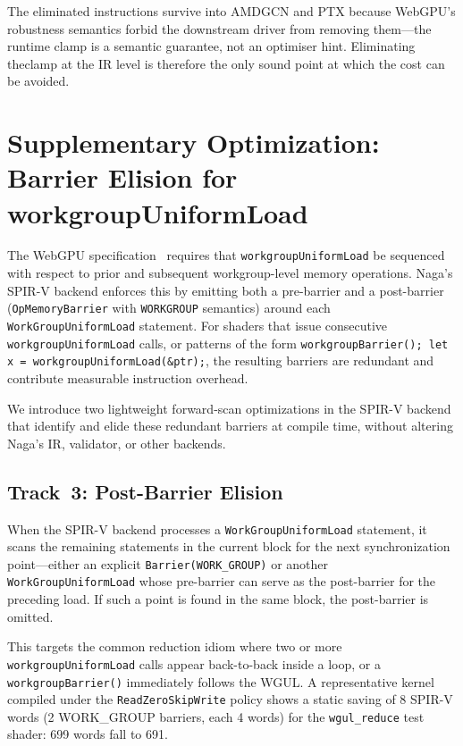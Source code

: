 \documentclass[10pt,a4paper,twocolumn]{article}
\begin{document}
The eliminated instructions survive into AMDGCN and PTX because WebGPU's
robustness semantics forbid the downstream driver from removing them---the
runtime clamp is a semantic guarantee, not an optimiser hint. Eliminating theclamp at the IR level is therefore the only sound point at which the cost can be avoided.

\section{Supplementary Optimization: Barrier Elision for workgroupUniformLoad}
\label{sec:barrier-elision}

The WebGPU specification~\cite{webgpu} requires that
\texttt{workgroupUniformLoad} be sequenced with respect to prior and
subsequent workgroup-level memory operations.  Naga's SPIR-V backend enforces
this by emitting both a pre-barrier and a post-barrier
(\texttt{OpMemoryBarrier} with \texttt{WORKGROUP} semantics) around each
\texttt{WorkGroupUniformLoad} statement.  For shaders that issue consecutive
\texttt{workgroupUniformLoad} calls, or patterns of the form
\texttt{workgroupBarrier(); let x = workgroupUniformLoad(\&ptr);}, the
resulting barriers are redundant and contribute measurable instruction overhead.

We introduce two lightweight forward-scan optimizations in the SPIR-V backend
that identify and elide these redundant barriers at compile time, without
altering Naga's IR, validator, or other backends.

\subsection{Track~3: Post-Barrier Elision}

When the SPIR-V backend processes a \texttt{WorkGroupUniformLoad} statement,
it scans the remaining statements in the current block for the next
synchronization point---either an explicit \texttt{Barrier(WORK\_GROUP)} or
another \texttt{WorkGroupUniformLoad} whose pre-barrier can serve as the
post-barrier for the preceding load.  If such a point is found in the same
block, the post-barrier is omitted.

This targets the common reduction idiom where two or more
\texttt{workgroupUniformLoad} calls appear back-to-back inside a loop, or a
\texttt{workgroupBarrier()} immediately follows the WGUL.  A representative
kernel compiled under the \texttt{ReadZeroSkipWrite} policy shows a static
saving of 8 SPIR-V words (2 WORK\_GROUP barriers, each 4 words) for
the \texttt{wgul\_reduce} test shader: 699 words fall to 691.
\end{document}
